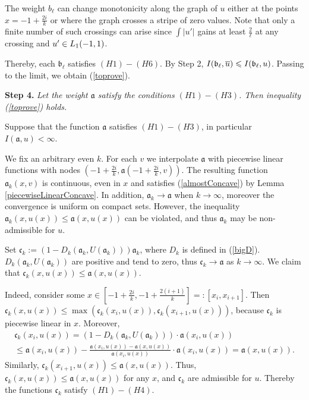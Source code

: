 The weight $b_{\ell}$ can change monotonicity along the graph of $u$
either at the points $x = -1 + \frac{2 i}{k}$ or where the graph crosses a stripe of zero values.
Note that only a finite number of such crossings can arise since
$\int |u'|$ gains at least $\frac{2}{\ell}$ at any crossing and $u' \in L_1(-1, 1)$.

Thereby, each $\mathfrak b_{\ell}$ satisfies $(H1)-(H6)$. By Step 2, $I(\mathfrak b_{\ell}, \mon{u}) \le I(\mathfrak b_{\ell}, u)$.
Passing to the limit, we obtain (\ref{toprove}).

\bigskip
\textbf{Step 4.} \textit{Let the weight $\mathfrak a$ satisfy the conditions $(H1)-(H3)$.
Then inequality (\ref{toprove}) holds.}

Suppose that the function $\mathfrak a$ satisfies $(H1)-(H3)$, in particular $I(\mathfrak a, u) < \infty$.

We fix an arbitrary even $k$.
For each $v$ we interpolate $\mathfrak a$ with piecewise linear functions
with nodes $( -1 + \frac{2i}{k}, \mathfrak a(-1 + \frac{2i}{k}, v) )$.
The resulting function $\mathfrak a_k(x, v)$ is continuous, even in $x$
and satisfies (\ref{almostConcave}) by Lemma \ref{piecewiseLinearConcave}.
In addition, $\mathfrak a_k \to \mathfrak a$ when $k \to \infty$,
moreover the convergence is uniform on compact sets.
However, the inequality $\mathfrak a_k(x, u(x)) \le \mathfrak a(x, u(x))$ can be violated,
and thus $\mathfrak a_k$ may be non-admissible for $u$.

Set $\mathfrak c_k := (1 - D_k(\mathfrak a_k, U(\mathfrak a_k))) \mathfrak a_k$, where $D_k$ is defined in (\ref{bigD}).
$D_k(\mathfrak a_k, U(\mathfrak a_k))$ are positive and tend to zero, thus $\mathfrak c_k \to \mathfrak a$ as $k \to \infty$.
We claim that $\mathfrak c_k(x, u(x)) \le \mathfrak a(x, u(x))$.

Indeed, consider some
$x \in [-1 + \frac{2i}{k}, -1 + \frac{2(i + 1)}{k}] =: [x_i, x_{i + 1}]$.
Then $\mathfrak c_k(x, u(x)) \le \max( \mathfrak c_k(x_i, u(x)), \mathfrak c_k(x_{i + 1}, u(x)) )$, because
$\mathfrak c_k$ is piecewise linear in $x$. Moreover,
\begin{multline*}
\mathfrak c_k(x_i, u(x)) = ( 1 - D_k(\mathfrak a_k, U(\mathfrak a_k))) \cdot \mathfrak a(x_i, u(x)) \\
\le \mathfrak a(x_i, u(x)) - \frac{\mathfrak a(x_i, u(x)) - \mathfrak a(x, u(x))}{\mathfrak a(x_i, u(x))} \cdot \mathfrak a(x_i, u(x)) = \mathfrak a(x, u(x)).
\end{multline*}
Similarly, $\mathfrak c_k(x_{i + 1}, u(x)) \le \mathfrak a(x, u(x))$.
Thus, $\mathfrak c_k(x, u(x)) \le \mathfrak a(x, u(x))$ for any $x$, and $\mathfrak c_k$ are admissible for $u$.
Thereby the functions $\mathfrak c_k$ satisfy $(H1)-(H4)$.

